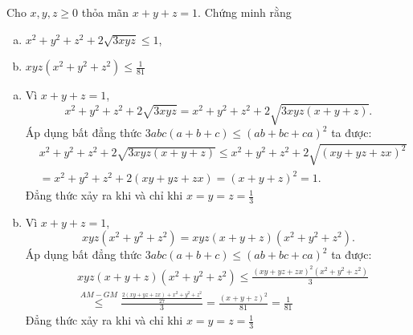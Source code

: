 \begin{problem}
Cho $x, y, z \ge 0$ thỏa mãn $x + y + z = 1$. Chứng minh rằng

\begin{enumerate}[(a)]
	\item $x^2 + y^2 + z^2 + 2\sqrt{3xyz} \le 1$,
	\item $xyz(x^2 + y^2 + z^2) \le \displaystyle \frac{1}{81}$
\end{enumerate}

\solution

\begin{enumerate}[(a)]
\item
	Vì $x + y + z = 1$,
	$$
		x^2 + y^2 + z^2 + 2\sqrt{3xyz} = x^2 + y^2 + z^2 + 2\sqrt{3xyz(x + y + z)}.
	$$
	Áp dụng bất đẳng thức $3abc(a + b + c) \le (ab + bc + ca)^2$ ta được:
	\begin{align*}
		& x^2 + y^2 + z^2 + 2\sqrt{3xyz(x + y + z)} \le x^2 + y^2 + z^2 + 2\sqrt{(xy + yz + zx)^2} \\
		&= x^2 + y^2 + z^2 + 2(xy + yz + zx) = (x + y + z)^2 = 1.
	\end{align*}
	Đẳng thức xảy ra khi và chỉ khi $x = y = z = \displaystyle \frac{1}{3}$

\item
	Vì $x + y + z = 1$,
	$$
		xyz(x^2 + y^2 + z^2) = xyz(x + y + z)(x^2 + y^2 + z^2).
	$$
	Áp dụng bất đẳng thức $3abc(a + b + c) \le (ab + bc + ca)^2$ ta được:
	\begin{align*}
		&xyz(x + y + z)(x^2 + y^2 + z^2) \le \frac{(xy + yz + zx)^2(x^2 + y^2 + z^2)}{3} \\
		&\overset{AM - GM}{\le} \frac{\displaystyle \frac{2(xy + yz + zx) + x^2 + y^2 + z^2}{27}}{3} 
		= \frac{(x + y + z)^2}{81} = \frac{1}{81}
	\end{align*}
	Đẳng thức xảy ra khi và chỉ khi $x = y = z = \displaystyle \frac{1}{3}$
\end{enumerate}
\end{problem}